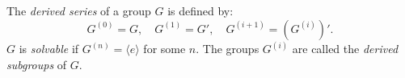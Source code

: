 The \emph{derived series} of a group $G$ is defined by:
$$G^{(0)} = G, \quad G^{(1)} = G', \quad G^{(i+1)} = (G^{(i)})'.$$
$G$ is \emph{solvable} if $G^{(n)} = \langle e \rangle$ for some $n$. The groups $G^{(i)}$ are called the \emph{derived subgroups} of $G$.
